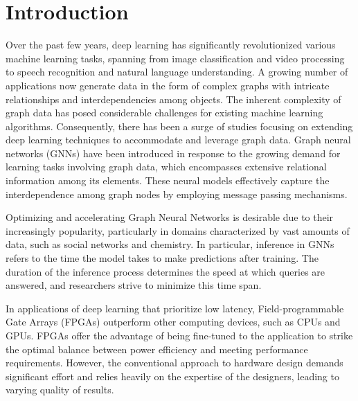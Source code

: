 \documentclass[11pt,a4paper,twocolumn]{article}
\begin{document}



\section{Introduction}
\label{sec:introduction}%

Over the past few years, deep learning has significantly revolutionized various machine learning tasks,
spanning from image classification and video processing to speech recognition and natural language understanding.
A growing number of applications now generate data in the form of complex graphs with intricate relationships and interdependencies among objects.
The inherent complexity of graph data has posed considerable challenges for existing machine learning algorithms.
Consequently, there has been a surge of studies focusing on extending deep learning techniques to accommodate
and leverage graph data.
Graph neural networks (GNNs) have been introduced in response to the growing demand for learning tasks involving
graph data, which encompasses extensive relational information among its elements.
These neural models effectively capture the interdependence among graph nodes by employing message passing mechanisms.

Optimizing and accelerating Graph Neural Networks is desirable due to their increasingly popularity, particularly in domains characterized by vast amounts of data,
such as social networks and chemistry.
In particular, inference in GNNs refers to the time the model takes to make predictions after training.
The duration of the inference process determines the speed at which queries are answered, and researchers strive to minimize this time span.

In applications of deep learning that prioritize low latency, Field-programmable Gate Arrays (FPGAs) outperform other computing devices, such as CPUs and GPUs.
FPGAs offer the advantage of being fine-tuned to the application to strike the optimal balance between power efficiency and meeting performance requirements.
However, the conventional approach to hardware design demands significant effort and relies heavily on the expertise of the designers, leading to varying quality of results.
\end{document}
